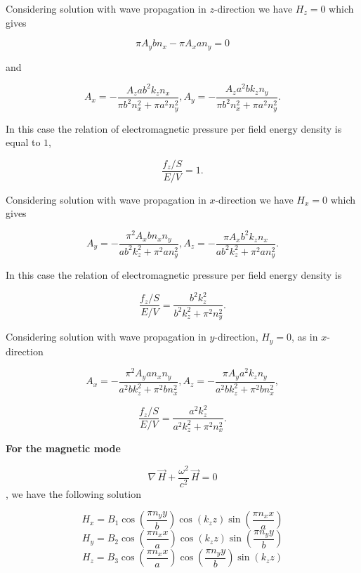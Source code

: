 \documentclass[twoside, 10pt, ptm]{article}
\begin{document}
\begin{multicols}{2}

    Considering solution with wave propagation in \(z\)-direction we have
\(H_z = 0\) which gives

    \[\pi A_{y} b n_{x} - \pi A_{x} a n_{y} = 0\]

    and

\[A_{x} = -\frac{A_{z} a b^{2} k_{z} n_{x}}{\pi b^{2} n_{x}^{2} + \pi a^{2} n_{y}^{2}},
A_{y} = -\frac{A_{z} a^{2} b k_{z} n_{y}}{\pi b^{2} n_{x}^{2} + \pi a^{2} n_{y}^{2}}.\]

    In this case the relation of electromagnetic pressure per field energy density
is equal to \(1\),

\begin{equation}\frac{f_z/S}{E/V} = 1.\end{equation}

    Considering solution with wave propagation in \(x\)-direction we have
\(H_x = 0\) which gives

    \[A_{y} = -\frac{\pi^{2} A_{x} b n_{x} n_{y}}{a b^{2} k_{z}^{2} + \pi^{2} a n_{y}^{2}},
A_{z} = -\frac{\pi A_{x} b^{2} k_{z} n_{x}}{a b^{2} k_{z}^{2} + \pi^{2} a n_{y}^{2}}.\]

    In this case the relation of electromagnetic pressure per field energy density is

\begin{equation}\frac{f_z/S}{E/V} = \frac{b^{2} k_{z}^{2}}{b^{2} k_{z}^{2} + \pi^{2} n_{y}^{2}}.\end{equation}

    Considering solution with wave propagation in \(y\)-direction,
\(H_y = 0\), as in \(x\)-direction

\[A_{x} = -\frac{\pi^{2} A_{y} a n_{x} n_{y}}{a^{2} b k_{z}^{2} + \pi^{2} b n_{x}^{2}},
A_{z} = -\frac{\pi A_{y} a^{2} k_{z} n_{y}}{a^{2} b k_{z}^{2} + \pi^{2} b n_{x}^{2}},\]

\begin{equation}\frac{f_z/S}{E/V} = \frac{a^{2} k_{z}^{2}}{a^{2} k_{z}^{2} + \pi^{2} n_{x}^{2}}.\end{equation}

    \textbf{For the magnetic mode}

\begin{equation}\nabla\,\vec{H} + \frac{\omega^2}{c^2}\,\vec{H} = 0\end{equation}, we have the
following solution

    \[H_{x} = B_{1} \cos\left(\frac{\pi n_{y} y}{b}\right) \cos\left(k_{z} z\right) \sin\left(\frac{\pi n_{x} x}{a}\right)\]
\[H_{y} = B_{2} \cos\left(\frac{\pi n_{x} x}{a}\right) \cos\left(k_{z} z\right) \sin\left(\frac{\pi n_{y} y}{b}\right)\]
\[H_{z} = B_{3} \cos\left(\frac{\pi n_{x} x}{a}\right) \cos\left(\frac{\pi n_{y} y}{b}\right) \sin\left(k_{z} z\right)\]


\end{multicols}
\end{document}
